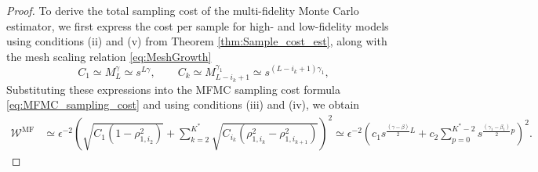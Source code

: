 \begin{proof}\label{eq:Sample_cost_est}
To derive the total sampling cost of the multi-fidelity Monte Carlo estimator, we first express the cost per sample for high- and low-fidelity models using conditions (ii) and (v) from Theorem \ref{thm:Sample_cost_est}, along with the mesh scaling relation \eqref{eq:MeshGrowth}
%
\[
C_1\simeq M_L^\gamma \simeq s^{L\gamma},\qquad  C_k \simeq M_{L-i_k+1}^{\gamma_1}\simeq s^{(L-i_k+1)\gamma_1},
\]
%
Substituting these expressions into the MFMC sampling cost formula \eqref{eq:MFMC_sampling_cost} and using conditions (iii) and (iv), we obtain
%
\begin{align*}
    \mathcal{W}^\text{MF} &\simeq \epsilon^{-2}\left(\sqrt{C_1\left(1 - \rho_{1,i_2}^2\right)}+\sum_{k=2}^{K^*} \sqrt{C_{i_k}\left(\rho_{1,{i_k}}^2 - \rho_{1,i_{k+1}}^2\right)} \right)^2 \simeq \epsilon^{-2}\left(c_1s^{\frac{(\gamma-\beta)}{2}L}+c_2\sum_{p=0}^{K^*-2}s^{\frac{(\gamma_1-\beta_1)}{2}p}\right)^2.
\end{align*}


\end{proof}
